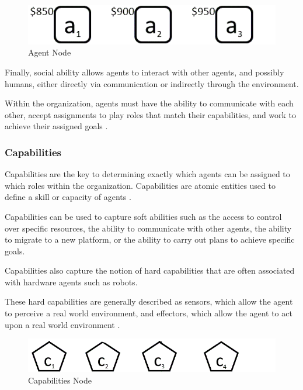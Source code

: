 \hspace{1cm}
\begin{figure}[th]
	\centering
		\includegraphics[scale=0.5]{ch1/img/agents}
	\caption{\label{fig:Agent Node}Agent Node}
\end{figure}
\hspace{1cm}



Finally, social ability allows agents to interact with
other agents, and possibly humans, either directly via communication or indirectly through the
environment.

Within the organization, agents must have the ability to communicate with each other, accept
assignments to play roles that match their capabilities, and work to achieve their assigned goals \cite{omacs2}.


\subsubsection{Capabilities} 

Capabilities are the key to determining exactly which agents can be assigned to which roles
within the organization. Capabilities are atomic entities used to define a skill or capacity of
agents \cite{omacs2}.

Capabilities can be used to capture soft abilities such as the access to control over specific
resources, the ability to communicate with other agents, the ability to migrate to a new platform,
or the ability to carry out plans to achieve specific goals. 

Capabilities also capture the notion of hard capabilities that are often associated 
with hardware agents such as robots. 

These hard capabilities are generally described as sensors, which allow the agent to perceive a real world
environment, and effectors, which allow the agent to act upon a real world environment \cite{omacs2}.

\hspace{1cm}
\begin{figure}[th]
	\centering
		\includegraphics[scale=0.5]{ch1/img/capabilities}
	\caption{\label{fig:Cap Node}Capabilities Node}
\end{figure}
\hspace{0.5cm}


